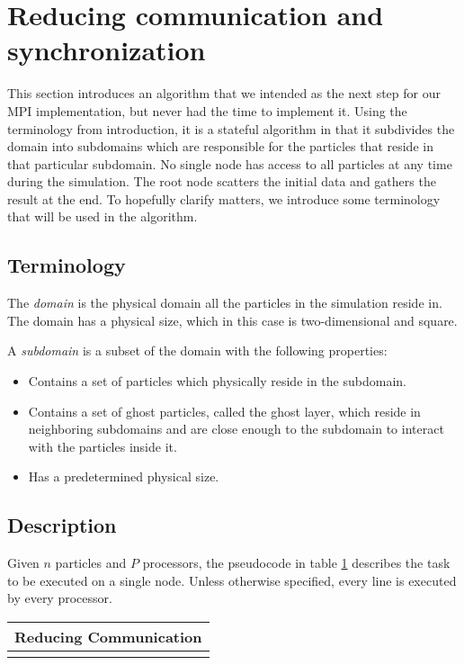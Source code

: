 \documentclass[11pt]{article}
\begin{document}
\FloatBarrier

\section{Reducing communication and synchronization}
This section introduces an algorithm that we intended as the next step for our MPI implementation, but never had the time to implement it. Using the terminology from introduction, it is a stateful algorithm in that it subdivides the domain into subdomains which are responsible for the particles that reside in that particular subdomain. No single node has access to all particles at any time during the simulation. The root node scatters the initial data and gathers the result at the end. To hopefully clarify matters, we introduce some terminology that will be used in the algorithm.

\subsection{Terminology}
The \emph{domain} is the physical domain all the particles in the simulation reside in. The domain has a physical size, which in this case is two-dimensional and square.

A \emph{subdomain} is a subset of the domain with the following properties:
\begin{itemize}
\item Contains a set of particles which physically reside in the subdomain.
\item Contains a set of ghost particles, called the ghost layer, which reside in neighboring subdomains and are close enough to the subdomain to interact with the particles inside it.
\item Has a predetermined physical size.
\end{itemize}

\subsection{Description}
Given $n$ particles and $P$ processors, the pseudocode in table \ref{tab:reduce_communication} describes the task to be executed on a single node. Unless otherwise specified, every line is executed by every processor.

\begin{table}[htb]
  \centering
  \begin{tabular}{l}
    \hline
      Reducing Communication\\
    \hline
      \\
    \hline
  \end{tabular}
  \label{tab:reduce_communication}
\end{table}
\end{document}

